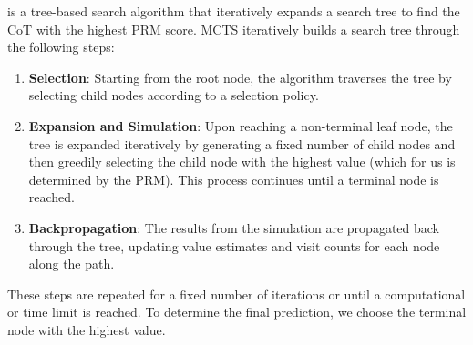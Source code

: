  is a tree-based search algorithm that iteratively expands a search tree to find the CoT with the highest PRM score. MCTS iteratively builds a search tree through the following steps:
\begin{enumerate}
    \item \textbf{Selection}: Starting from the root node, the algorithm traverses the tree by selecting child nodes according to a selection policy.
    \item \textbf{Expansion and Simulation}: Upon reaching a non-terminal leaf node, the tree is expanded iteratively by generating a fixed number of child nodes and then greedily selecting the child node with the highest value (which for us is determined by the PRM). This process continues until a terminal node is reached.
    \item \textbf{Backpropagation}: The results from the simulation are propagated back through the tree, updating value estimates and visit counts for each node along the path.
\end{enumerate}
These steps are repeated for a fixed number of iterations or until a computational or time limit is reached. To determine the final prediction, we choose the terminal node with the highest value.


\clearpage